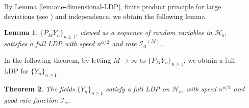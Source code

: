 \documentclass[a4paper, 11pt]{article}
\newcommand{\1}{\mathbf 1}
\theoremstyle{plain}
\newtheorem{theorem}{Theorem}[section]
\newtheorem{lemma}[theorem]{Lemma}
\begin{document}
By Lemma \ref{lem:one-dimensional-LDP}, finite product principle for large deviations (see \cite[Exercise 4.2.7]{DemboZeitouni2010}) and independence, we obtain the following lemma.

\begin{lemma}\label{54gtrehr6r}
\(\{P_MY_n\}_{n\geq1}\), viewed as a sequence of random variables in \(\mathcal{H}_b\), satisfies a full LDP with speed
\(n^{\alpha/2}\) and rate \(\mathcal{I_{\alpha}}^{(M)}\).
\end{lemma}

In the following theorem, by letting $M\to\infty$ to \(\{P_MY_n\}_{n\geq1}\), we obtain a full LDP for \(\{Y_n\}_{n\geq1}\).
\begin{theorem}\label{thm:tree-field-LDP}
The fields \(\{Y_n\}_{n\geq1}\) satisfy a full LDP on \(\mathcal{H}_b\), with speed
\(n^{\alpha/2}\) and good rate function \(\mathcal{I_{\alpha}}\).
\end{theorem}
\end{document}
